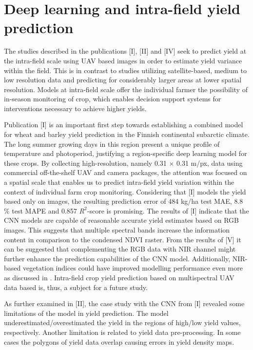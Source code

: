 \section{Deep learning and intra-field yield prediction}

The studies described in the publications [I], [II] and [IV] seek to predict yield at the intra-field scale using UAV based images in order to estimate yield variance within the field. This is in contrast to studies utilizing satellite-based, medium to low resolution data and predicting for considerably larger areas at lower spatial resolution. Models at intra-field scale offer the individual farmer the possibility of in-season monitoring of crop, which enables decision support systems for interventions necessary to achieve higher yields. 

Publication [I] is an important first step towards establishing a combined model for wheat and barley yield prediction in the Finnish continental subarctic climate. The long summer growing days in this region present a unique profile of temperature and photoperiod, justifying a region-specific deep learning model for these crops. By collecting high-resolution, namely 0.31 $\times$ 0.31 m/px, data using commercial off-the-shelf UAV and camera packages, the attention was focused on a spatial scale that enables us to predict intra-field yield variation within the context of individual farm crop monitoring. Considering that [I] models the yield based only on images, the resulting prediction error of 484 kg/ha test MAE, 8.8 \% test MAPE and 0.857 $R^2$-score is promising. The results of [I] indicate that the CNN models are capable of reasonable accurate yield estimates based on RGB images. This suggests that multiple spectral bands increase the information content in comparison to the condensed NDVI raster. From the results of [V] it can be suggested that complementing the RGB data with NIR channel might further enhance the prediction capabilities of the CNN model. Additionally, NIR-based vegetation indices could have improved modelling performance even more as discussed in \cite{Zhao2020}. Intra-field crop yield prediction based on multispectral UAV data based is, thus, a subject for a future study.

As further examined in [II], the case study with the CNN from [I] revealed some limitations of the model in yield prediction. The model underestimated/overestimated the yield in the regions of high/low yield values, respectively. Another limitation is related to yield data pre-processing. In some cases the polygons of yield data overlap causing errors in yield density maps.
 
